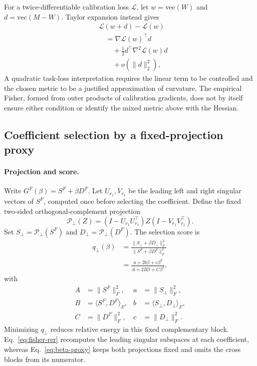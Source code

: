 For a twice-differentiable calibration loss $\mathcal L$, let $w=\mathrm{vec}(W)$ and $d=\mathrm{vec}(M-W)$. Taylor expansion instead gives
\begin{equation}
\begin{aligned}
&\mathcal L(w+d)-\mathcal L(w)\\
&\quad=\nabla\mathcal L(w)^\top d \\
&\qquad+\tfrac12 d^\top\nabla^2\mathcal L(w)d\\
&\qquad+o(\|d\|_2^2),
\end{aligned}
\end{equation}
A quadratic task-loss interpretation requires the linear term to be controlled and the chosen metric to be a justified approximation of curvature. The empirical Fisher, formed from outer products of calibration gradients, does not by itself ensure either condition or identify the mixed metric above with the Hessian.



\subsection{Coefficient selection by a fixed-projection proxy}\label{sup:beta-proxy}

\paragraph{Projection and score.}
Write $G^F(\beta)=S^F+\beta D^F$. Let $U_{r_1},V_{r_1}$ be the leading left and right singular vectors of $S^F$, computed once before selecting the coefficient. Define the fixed two-sided orthogonal-complement projection
\begin{equation}
\mathcal P_\perp(Z)=(I-U_{r_1}U_{r_1}^\top)Z
(I-V_{r_1}V_{r_1}^\top).
\label{eq:beta-projection}
\end{equation}
Set $S_\perp=\mathcal P_\perp(S^F)$ and $D_\perp=\mathcal P_\perp(D^F)$. The selection score is
\begin{equation}
\begin{aligned}
q_\perp(\beta)
&=\frac{\|S_\perp+\beta D_\perp\|_F^2}
{\|S^F+\beta D^F\|_F^2}\\
&=\frac{a+2b\beta+c\beta^2}{A+2B\beta+C\beta^2},
\end{aligned}
\label{eq:beta-proxy}
\end{equation}
with
\begin{equation}
\begin{aligned}
A&=\|S^F\|_F^2,& a&=\|S_\perp\|_F^2,\\
B&=\langle S^F,D^F\rangle_F,& b&=\langle S_\perp,D_\perp\rangle_F,\\
C&=\|D^F\|_F^2,& c&=\|D_\perp\|_F^2.
\end{aligned}
\label{eq:beta-coefficients}
\end{equation}
Minimizing $q_\perp$ reduces relative energy in this fixed complementary block. Eq.~\eqref{eq:fisher-rer} recomputes the leading singular subspaces at each coefficient, whereas Eq.~\eqref{eq:beta-proxy} keeps both projections fixed and omits the cross blocks from its numerator.

